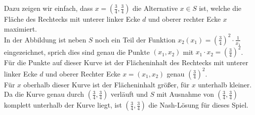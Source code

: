 \documentclass{scrartcl}
\begin{document}
Dazu zeigen wir einfach, dass $x =(\frac{3}{4}, \frac{3}{4})$ die Alternative $x \in S$ ist, welche die Fläche
des Rechtecks mit unterer linker Ecke $d$ und oberer rechter Ecke $x$ maximiert. \\

In der Abbildung ist neben $S$ noch ein Teil der Funktion $x_2(x_1) = (\frac{3}{4})^2 \cdot \frac{1}{x_1}$
eingezeichnet, sprich dies sind genau die Punkte $(x_1, x_2)$ mit $x_1 \cdot x_2 = (\frac{3}{4})^2$. Für die
Punkte auf dieser Kurve ist der Flächeninhalt des Rechtecks mit unterer linker Ecke $d$ und oberer Rechter
Ecke $x = (x_1, x_2)$ genau $(\frac{3}{4})^2$. \\

Für $x$ oberhalb dieser Kurve ist der Flächeninhalt größer, für $x$ unterhalb kleiner. Da die Kurve genau durch
$(\frac{3}{4}, \frac{3}{4})$ verläuft und $S$ mit Ausnahme von $(\frac{3}{4}, \frac{3}{4})$ komplett unterhalb der
Kurve liegt, ist $(\frac{3}{4}, \frac{3}{4})$ die Nash-Lösung für dieses Spiel.
\end{document}
